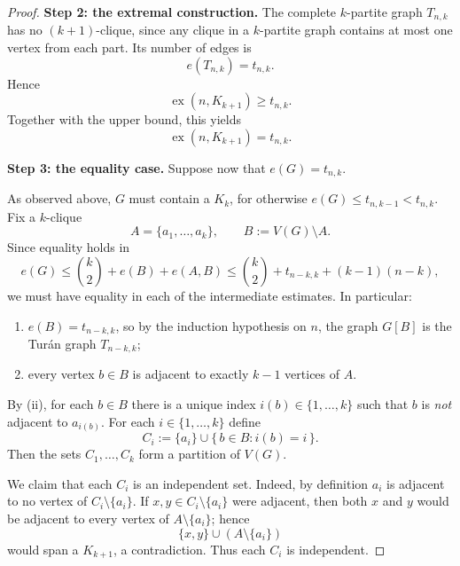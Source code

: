 \documentclass[11pt, a4paper]{ctexrep}
\begin{document}
\begin{proof}
    \medskip
    \noindent
    \textbf{Step 2: the extremal construction.}
    The complete $k$-partite graph $T_{n,k}$ has no $(k+1)$-clique, since any clique in a
    $k$-partite graph contains at most one vertex from each part.
    Its number of edges is
    \[
        e(T_{n,k})=t_{n,k}.
    \]
    Hence
    \[
        \operatorname{ex}(n,K_{k+1})\ge t_{n,k}.
    \]
    Together with the upper bound, this yields
    \[
        \operatorname{ex}(n,K_{k+1})=t_{n,k}.
    \]

    \medskip
    \noindent
    \textbf{Step 3: the equality case.}
    Suppose now that $e(G)=t_{n,k}$.

    As observed above, $G$ must contain a $K_k$, for otherwise
    $e(G)\le t_{n,k-1}<t_{n,k}$.
    Fix a $k$-clique
    \[
        A=\{a_1,\dots,a_k\},
        \qquad
        B:=V(G)\setminus A.
    \]
    Since equality holds in
    \[
        e(G)\le \binom{k}{2}+e(B)+e(A,B)\le \binom{k}{2}+t_{n-k,k}+(k-1)(n-k),
    \]
    we must have equality in each of the intermediate estimates. In particular:
    \begin{enumerate}
        \item[(i)] $e(B)=t_{n-k,k}$, so by the induction hypothesis on $n$, the graph $G[B]$
              is the Tur\'an graph $T_{n-k,k}$;
        \item[(ii)] every vertex $b\in B$ is adjacent to exactly $k-1$ vertices of $A$.
    \end{enumerate}

    By (ii), for each $b\in B$ there is a unique index $i(b)\in\{1,\dots,k\}$ such that
    $b$ is \emph{not} adjacent to $a_{i(b)}$.
    For each $i\in\{1,\dots,k\}$ define
    \[
        C_i:=\{a_i\}\cup \{\, b\in B : i(b)=i \,\}.
    \]
    Then the sets $C_1,\dots,C_k$ form a partition of $V(G)$.

    We claim that each $C_i$ is an independent set.
    Indeed, by definition $a_i$ is adjacent to no vertex of $C_i\setminus\{a_i\}$.
    If $x,y\in C_i\setminus\{a_i\}$ were adjacent, then both $x$ and $y$ would be adjacent
    to every vertex of $A\setminus\{a_i\}$; hence
    \[
        \{x,y\}\cup (A\setminus\{a_i\})
    \]
    would span a $K_{k+1}$, a contradiction.
    Thus each $C_i$ is independent.


\end{proof}
\end{document}
